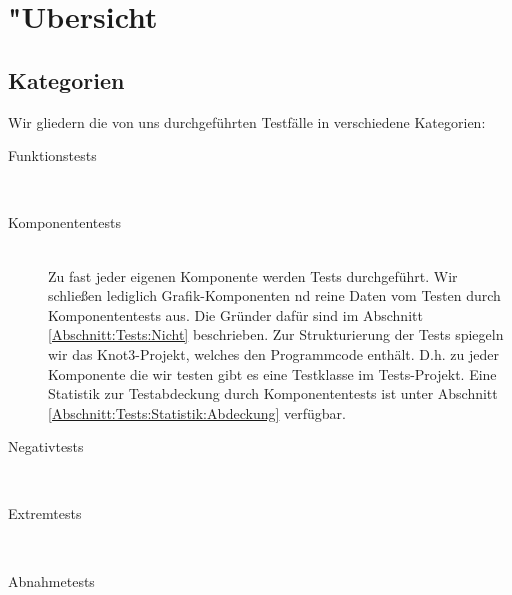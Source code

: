 %



\section{{"U}bersicht}
\label{Abschnitt:Tests:Uebersicht}



\subsection{Kategorien}
\label{Abschnitt:Tests:Uebersicht:Kategorien}

Wir gliedern die von uns durchgeführten Testfälle in verschiedene Kategorien:\\


\begin{description} %


	\item[Funktionstests] \hfill
	\\
	
	
	\item[Komponententests] \hfill
	\\
	
	Zu fast jeder eigenen Komponente werden Tests durchgeführt. Wir schließen lediglich Grafik-Komponenten nd reine Daten vom Testen durch Komponententests aus. Die Gründer dafür sind im Abschnitt \ref{Abschnitt:Tests:Nicht} beschrieben. Zur Strukturierung der Tests spiegeln wir das Knot3-Projekt, welches den Programmcode enthält. D.h. zu jeder Komponente die wir testen gibt es eine Testklasse im Tests-Projekt. Eine Statistik zur Testabdeckung durch Komponententests ist unter Abschnitt \ref{Abschnitt:Tests:Statistik:Abdeckung} verfügbar.\\


	\item[Negativtests] \hfill
	\\

	
	\item[Extremtests] \hfill
	\\


	\item[Abnahmetests] \hfill
	\\
		
\end{description}










